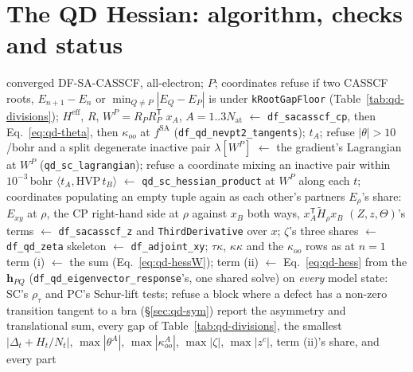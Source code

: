 \documentclass[11pt]{article}
\newcommand{\code}[1]{\texttt{#1}}
\newcommand{\Heff}{H^{\mathrm{eff}}}
\newcommand{\T}{\mathsf T}
\begin{document}
\section{The QD Hessian: algorithm, checks and status}
\label{sec:qd-build}

\begin{algorithm}[htbp]
\caption{Analytic DF-QD-NEVPT2 nuclear Hessian of state $P$
(\code{df\_qd\_sc\_nevpt2}; \code{df\_qd\_pc\_nevpt2} the same over PC's walk)}
\label{alg:qdhess}
\begin{algorithmic}[1]
\Require converged DF-SA-CASSCF, all-electron; $P$; coordinates
\State refuse if two CASSCF roots, $E_{n+1} - E_n$ or $\min_{Q\neq P}|E_Q - E_P|$ is under \code{kRootGapFloor} (Table~\ref{tab:qd-divisions}); $\Heff$, $R$, $W^P = R_PR_P^\T$
\State $x_A$, $A = 1..3N_{\mathrm{at}}$ $\gets$ \code{df\_sacasscf\_cp}, then Eq.~\eqref{eq:qd-theta}, then $\kappa_{oo}$ at $f^{\mathrm{SA}}$ (\code{df\_qd\_nevpt2\_tangents}); $t_A$; refuse $|\theta| > 10$/bohr and a split degenerate inactive pair
\State $\lambda[W^P]$ $\gets$ the gradient's Lagrangian at $W^P$ (\code{qd\_sc\_lagrangian}); refuse a coordinate mixing an inactive pair within $10^{-3}$\,bohr
\State $\langle t_A, \mathrm{HVP}\,t_B\rangle$ $\gets$ \code{qd\_sc\_hessian\_product} at $W^P$ along each $t$; coordinates populating an empty tuple again as each other's partners 
\State $E_\rho$'s share: $E_{xy}$ at $\rho$, the CP right-hand side at $\rho$ against $x_B$ both ways, $x_A^\T\tilde H_\rho x_B$
\State $(Z, z, \Theta)$'s terms $\gets$ \code{df\_sacasscf\_z} and \code{ThirdDerivative} over $x$; $\zeta$'s three shares $\gets$ \code{df\_qd\_zeta}
\State skeleton $\gets$ \code{df\_adjoint\_xy}; $\tau\kappa$, $\kappa\kappa$ and the $\kappa_{oo}$ rows as at $n = 1$ 
\State term (i) $\gets$ the sum (Eq.~\eqref{eq:qd-hessW}); term (ii) $\gets$ Eq.~\eqref{eq:qd-hess} from the $\mathbf h_{PQ}$ (\code{df\_qd\_eigenvector\_response}'s, one shared solve)
\State on \emph{every} model state: SC's $\rho_\tau$ and PC's Schur-lift tests; refuse a block where a defect has a non-zero transition tangent to a bra (\S\ref{sec:qd-sym})
\State report the asymmetry and translational sum, every gap of Table~\ref{tab:qd-divisions}, the smallest $|\Delta_t + H_t/N_t|$, $\max|\theta^A|$, $\max|\kappa^A_{oo}|$, $\max|\zeta|$, $\max|z^c|$, term (ii)'s share, and every part
\end{algorithmic}
\end{algorithm}
\end{document}
